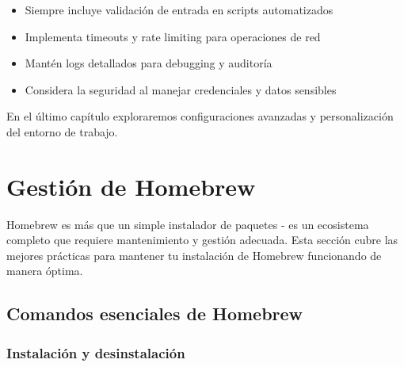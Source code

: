 \documentclass[
  11pt,
  letterpaper,
  oneside,
  openany]{scrbook}
\providecommand{\tightlist}{%
  \setlength{\itemsep}{0pt}\setlength{\parskip}{0pt}}
\begin{document}
\begin{tcolorbox}[enhanced jigsaw, toprule=.15mm, bottomrule=.15mm, opacityback=0, coltitle=black, rightrule=.15mm, colframe=quarto-callout-important-color-frame, titlerule=0mm, opacitybacktitle=0.6, left=2mm, colback=white, bottomtitle=1mm, arc=.35mm, leftrule=.75mm, title=\textcolor{quarto-callout-important-color}{\faExclamation}\hspace{0.5em}{Consideraciones para automatización}, colbacktitle=quarto-callout-important-color!10!white, breakable, toptitle=1mm]

\begin{itemize}
\tightlist
\item
  Siempre incluye validación de entrada en scripts automatizados
\item
  Implementa timeouts y rate limiting para operaciones de red
\item
  Mantén logs detallados para debugging y auditoría
\item
  Considera la seguridad al manejar credenciales y datos sensibles
\end{itemize}

\end{tcolorbox}

En el último capítulo exploraremos configuraciones avanzadas y
personalización del entorno de trabajo.

\chapter{Gestión de Homebrew}\label{gestiuxf3n-de-homebrew}

Homebrew es más que un simple instalador de paquetes - es un ecosistema
completo que requiere mantenimiento y gestión adecuada. Esta sección
cubre las mejores prácticas para mantener tu instalación de Homebrew
funcionando de manera óptima.

\section{Comandos esenciales de
Homebrew}\label{comandos-esenciales-de-homebrew}

\subsection{Instalación y
desinstalación}\label{instalaciuxf3n-y-desinstalaciuxf3n}
\end{document}
